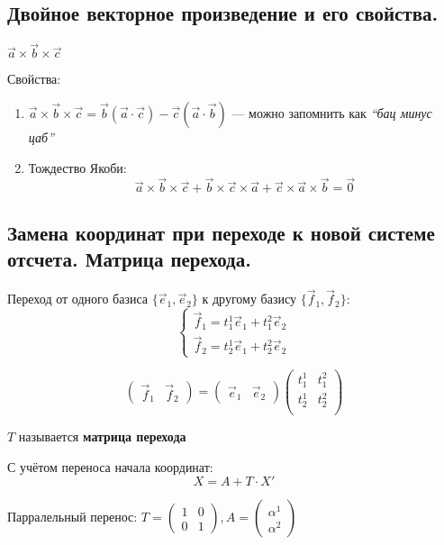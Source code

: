 \subsection{Двойное векторное произведение и его свойства.}
$\vec a\times\vec b\times\vec c$

Свойства:
\begin{enumerate}
    \item $\vec a\times\vec b\times\vec c=\vec b(\vec a\cdot\vec c) - \vec c(\vec a\cdot \vec b)$ --- можно запомнить как \textit{``бац минус цаб''}
    \item Тождество Якоби:
    $$\vec a\times\vec b\times\vec c+\vec b\times\vec c\times\vec a + \vec c\times\vec a\times\vec b=\vec 0$$
\end{enumerate}

\subsection{Замена координат при переходе к новой системе отсчета. Матрица перехода.}
Переход от одного базиса $\{\vec e_1, \vec e_2\}$ к другому базису $\{\vec f_1, \vec f_2\}$: $$\begin{cases}
    \vec f_1=t_1^1\vec e_1+t_1^2\vec e_2 \\
    \vec f_2=t_2^1\vec e_1+t_2^2\vec e_2
\end{cases}$$

$$\begin{pmatrix}
    \vec f_1 & \vec f_2
\end{pmatrix} = \begin{pmatrix}
    \vec e_1 & \vec e_2
\end{pmatrix} \begin{pmatrix}
    t_1^1 & t_1^2 \\
    t_2^1 & t_2^2 \\
\end{pmatrix}$$

\begin{definition}
    $T$ называется \textbf{матрица перехода}
\end{definition}

С учётом переноса начала координат: $$X=A+T\cdot X'$$

Парралельный перенос: $T=\begin{pmatrix}
    1 & 0 \\
    0 & 1
\end{pmatrix}, A=\begin{pmatrix}
    \alpha^1 \\
    \alpha^2
\end{pmatrix}$

